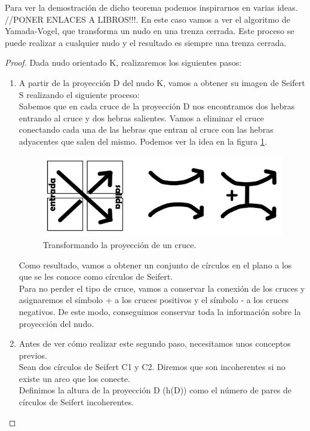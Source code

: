 Para ver la demostración de dicho teorema podemos inspirarnos en varias ideas. //PONER ENLACES A LIBROS!!!. En este caso vamos a ver el algoritmo de Yamada-Vogel, que transforma un nudo en una trenza cerrada. Este proceso se puede realizar a cualquier nudo y el resultado es siempre una trenza cerrada. 
\begin{proof}
	Dada nudo orientado K, realizaremos los siguientes pasos:
	\begin{enumerate}
		\item A partir de la proyección D del nudo K, vamos a obtener su imagen de Seifert S realizando el siguiente proceso:\\
		Sabemos que en cada cruce de la proyección D nos encontramos dos hebras entrando al cruce y dos hebras salientes. Vamos a eliminar el cruce conectando cada una de las hebras que entran al cruce con las hebras adyacentes que salen del mismo. Podemos ver la idea en la figura \ref{prueale1}.\\
		
		\begin{figure}[h!]
			\centering
			\includegraphics[width=12cm]{inudos/ima8.png}
			\caption{Transformando la proyección de un cruce.}
			\label{prueale1} 
		\end{figure}
		
		
		Como resultado, vamos a obtener un conjunto de círculos en el plano a los que se les conoce como círculos de Seifert. \\
		Para no perder el tipo de cruce, vamos a conservar la conexión de los cruces y asignaremos el símbolo + a los cruces positivos y el símbolo - a los cruces negativos. De este modo, conseguimos conservar toda la información sobre la proyección del nudo. \\
		
		\item Antes de ver cómo realizar este segundo paso, necesitamos unos conceptos previos. \\
	
		Sean dos círculos de Seifert C1 y C2. Diremos que son incoherentes si no existe un arco que los conecte.\\
		Definimos la altura de la proyección D (h(D)) como el número de pares de círculos de Seifert incoherentes.\\
		

\end{enumerate}
\end{proof}
